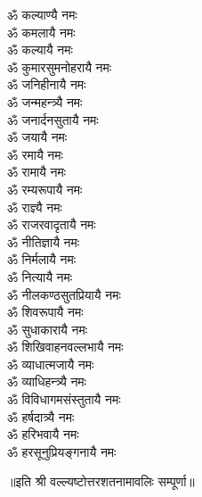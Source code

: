 \begin{flushleft}
\begin{multicols}{2}
ॐ कल्याण्यै नमः\\
ॐ कमलायै नमः\\
ॐ कल्यायै नमः\\
ॐ कुमारसुमनोहरायै नमः\\
ॐ जनिहीनायै नमः\\
ॐ जन्महन्त्र्यै नमः\\
ॐ जनार्दनसुतायै नमः\\
ॐ जयायै नमः\hfill{}\\
ॐ रमायै नमः\\
ॐ रामायै नमः\\
ॐ रम्यरूपायै नमः\\
ॐ राज्ञ्यै नमः\\
ॐ राजरवादृतायै नमः\\
ॐ नीतिज्ञायै नमः\\
ॐ निर्मलायै नमः\\
ॐ नित्यायै नमः\\
ॐ नीलकण्ठसुतप्रियायै नमः\\
ॐ शिवरूपायै नमः\hfill{}\\
ॐ सुधाकारायै नमः\\
ॐ शिखिवाहनवल्लभायै नमः\\
ॐ व्याधात्मजायै नमः\\
ॐ व्याधिहन्त्र्यै नमः\\
ॐ विविधागमसंस्तुतायै नमः\\
ॐ हर्षदात्र्यै नमः\\
ॐ हरिभवायै नमः\\
ॐ हरसूनुप्रियङ्गनायै नमः\\
\end{multicols}
\end{flushleft}
\centerline{॥इति श्री वल्ल्यष्टोत्तरशतनामावलिः सम्पूर्णा॥}
